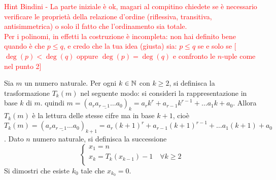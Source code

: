 \textcolor{red}{Hint Bindini -  La parte iniziale è ok, magari al compitino chiedete se è necessario verificare le proprietà della relazione d'ordine (riflessiva, transitiva, antisimmetrica) o solo il fatto che l'ordinamento sia totale. \\
  Per i polinomi, in effetti la costruzione è incompleta: non hai definito bene quando è che $ p \leq q $, e credo che la tua idea (giusta) sia: $ p \leq q $ se e solo se [$ \deg(p) < \deg(q) $ oppure $ \deg(p) = \deg(q) $ e confronto le $ n $-uple come nel punto 2]}

\begin{es}
  Sia $ m $ un numero naturale. Per ogni $ k \in \mathbb{N} $ con $ k \geq 2 $, si definisca la trasformazione $ T_k(m) $ nel seguente modo: si consideri la rappresentazione in base $ k $ di $ m $. quindi $ m = (\underline{a_r a_{r-1} \dots a_0})_k = a_r k^r + a_{r-1} k^{r-1} + \dots a_1 k + a_0 $. Allora $ T_k(m) $ è la lettura delle stesse cifre ma in base $ k + 1 $, cioè $ T_k(m) = (\underline{a_r a_{r-1} \dots a_0})_{k+1} = a_r (k + 1)^r + a_{r-1} (k + 1)^{r-1} + \dots a_1 (k + 1) + a_0 $. Dato $ n $ numero naturale, si definisca la successione
  \[\begin{cases*}
      x_1 = n \\
      x_k = T_k(x_{k-1}) - 1 \quad \forall k \geq 2 \\
    \end{cases*}\]
  Si dimostri che esiste $ k_0 $ tale che $ x_{k_0} = 0. $
\end{es}


